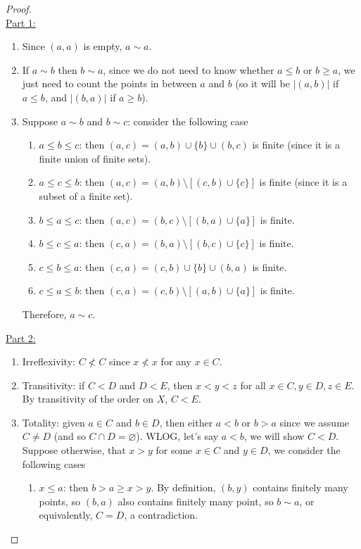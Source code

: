 \documentclass{treatise}
\begin{document}
\begin{proof} \ \\
\underline{Part 1:}
\begin{enumerate}[label=(\alph*)]
    \item Since $(a, a)$ is empty, $a \sim a$.
    \item If $a \sim b$ then $b \sim a$, since we do not need to know whether $a \leq b$ or $b \geq a$, we just need to count the points in between $a$ and $b$ (so it will be $|(a, b)|$ if $a \leq b$, and $|(b, a)|$ if $a \geq b$).
    \item Suppose $a \sim b$ and $b \sim c$: consider the following case
    \begin{enumerate}[label = \roman*.]
        \item $a \leq b \leq c$: then $(a, c) = (a, b) \cup \{ b \} \cup (b, c)$ is finite (since it is a finite union of finite sets).
        \item $a \leq c \leq b$: then $(a, c) = (a, b) \setminus [(c, b) \cup \{ c \}]$ is finite (since it is a subset of a finite set).
        \item $b \leq a \leq c$: then $(a, c) = (b, c) \setminus [(b, a) \cup \{ a \}]$ is finite.
        \item $b \leq c \leq a$: then $(c, a) = (b, a) \setminus [(b, c) \cup \{ c \}]$ is finite.
        \item $c \leq b \leq a$: then $(c, a) = (c, b) \cup \{ b \} \cup (b, a)$ is finite.
        \item $c \leq a \leq b$: then $(c, a) = (c, b) \setminus [(a, b) \cup \{ a \}]$ is finite.
    \end{enumerate}
    Therefore, $a \sim c$.
\end{enumerate}
\underline{Part 2:}
\begin{enumerate}[label = (\alph*)]
    \item Irreflexivity: $C \not< C$ since $x \not< x$ for any $x \in C$.
    \item Transitivity: if $C < D$ and $D < E$, then $x < y < z$ for all $x \in C, y \in D, z \in E$. By transitivity of the order on $X$, $C < E$.
    \item Totality: given $a \in C$ and $b \in D$, then either $a < b$ or $b > a$ since we assume $C \neq D$ (and so $C \cap D = \varnothing$). WLOG, let's say $a < b$, we will show $C < D$. Suppose otherwise, that $x > y$ for some $x \in C$ and $y \in D$, we consider the following cases
    \begin{enumerate}[label = \roman*.]
        \item $x \leq a$: then $b > a \geq x > y$. By definition, $(b, y)$ contains finitely many points, so $(b, a)$ also contains finitely many point, so $b \sim a$, or equivalently, $C = D$, a contradiction.

\end{enumerate}
\end{enumerate}
\end{proof}
\end{document}
